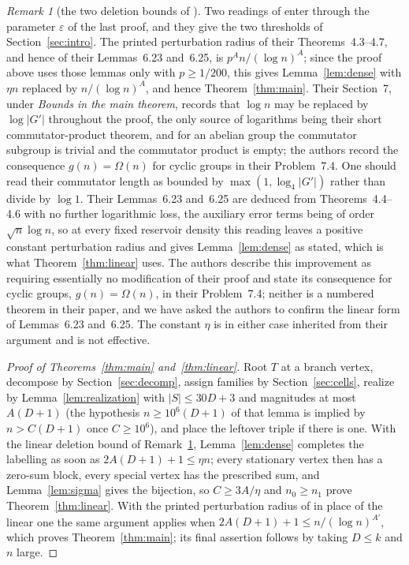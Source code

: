 \documentclass[11pt,a4paper]{article}
\theoremstyle{plain}
\theoremstyle{definition}
\theoremstyle{remark}
\newtheorem{remark}[theorem]{Remark}
\begin{document}
\begin{remark}[the two deletion bounds of \cite{MuyesserPokrovskiy2025}]\label{rem:mplinear}
Two readings of \cite{MuyesserPokrovskiy2025} enter through the parameter
$\varepsilon$ of the last proof, and they give the two thresholds of
Section~\ref{sec:intro}.  The printed perturbation radius of their
Theorems~4.3--4.7, and hence of their Lemmas~6.23 and~6.25, is
$p^{A}n/(\log n)^{A}$; since the proof above uses those lemmas only with
$p\ge1/200$, this gives Lemma~\ref{lem:dense} with $\eta n$ replaced by
$n/(\log n)^{A}$, and hence Theorem~\ref{thm:main}.  Their Section~7, under
\emph{Bounds in the main theorem}, records that $\log n$ may be replaced by
$\log|G'|$ throughout the proof, the only source of logarithms being their
short commutator-product theorem, and for an abelian group the commutator
subgroup is trivial and the commutator product is empty; the authors record
the consequence $g(n)=\Omega(n)$ for cyclic groups in their Problem~7.4.  One
should read their commutator length as bounded by $\max(1,\log_4|G'|)$ rather
than divide by $\log1$.  Their Lemmas~6.23 and~6.25 are deduced from
Theorems~4.4--4.6 with no further logarithmic loss, the auxiliary error terms
being of order $\sqrt n\log n$, so at every fixed reservoir density this
reading leaves a positive constant perturbation radius and gives
Lemma~\ref{lem:dense} as stated, which is what Theorem~\ref{thm:linear} uses.
The authors describe this improvement as requiring essentially no
modification of their proof and state its consequence for cyclic groups,
$g(n)=\Omega(n)$, in their Problem~7.4; neither is a numbered theorem in
their paper, and we have asked the authors to confirm the linear form of
Lemmas~6.23 and~6.25.  The constant $\eta$ is in either case inherited from
their argument and is not effective.
\end{remark}

\begin{proof}[Proof of Theorems~\ref{thm:main} and~\ref{thm:linear}]
Root $T$ at a branch vertex, decompose by Section~\ref{sec:decomp}, assign
families by Section~\ref{sec:cells}, realize by Lemma~\ref{lem:realization}
with $|S|\le 30D+3$ and magnitudes at most $A(D+1)$ (the hypothesis
$n\ge 10^6(D+1)$ of that lemma is implied by $n>C(D+1)$ once
$C\ge 10^6$), and place the leftover triple if there is one.  With the linear
deletion bound of Remark~\ref{rem:mplinear}, Lemma~\ref{lem:dense}
completes the labelling as soon as $2A(D+1)+1\le\eta n$; every stationary
vertex then has a zero-sum block, every special vertex has the prescribed sum,
and Lemma~\ref{lem:sigma} gives the bijection, so $C\ge 3A/\eta$ and
$n_0\ge n_1$ prove Theorem~\ref{thm:linear}.  With the printed perturbation
radius of \cite{MuyesserPokrovskiy2025} in place of the linear one the same
argument applies when $2A(D+1)+1\le n/(\log n)^{A'}$, which proves
Theorem~\ref{thm:main}; its final assertion follows by taking $D\le k$ and
$n$ large.
\end{proof}
\end{document}
